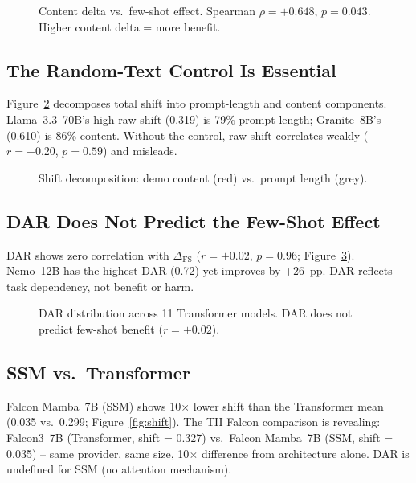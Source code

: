 \documentclass[11pt,a4paper]{article}
\begin{document}
\begin{figure}[t]
\centering

\caption{Content delta vs.\ few-shot effect. Spearman $\rho = +0.648$, $p = 0.043$. Higher content delta = more benefit.}
\label{fig:content_delta}
\end{figure}

\subsection{The Random-Text Control Is Essential}

Figure~\ref{fig:decomposition} decomposes total shift into prompt-length and content components. Llama~3.3~70B's high raw shift (0.319) is 79\% prompt length; Granite~8B's (0.610) is 86\% content. Without the control, raw shift correlates weakly ($r = +0.20$, $p = 0.59$) and misleads.

\begin{figure}[t]
\centering

\caption{Shift decomposition: demo content (red) vs.\ prompt length (grey).}
\label{fig:decomposition}
\end{figure}

\subsection{DAR Does Not Predict the Few-Shot Effect}

DAR shows zero correlation with $\Delta_{\text{FS}}$ ($r = +0.02$, $p = 0.96$; Figure~\ref{fig:dar}). Nemo~12B has the highest DAR (0.72) yet improves by +26~pp. DAR reflects task dependency, not benefit or harm.

\begin{figure}[t]
\centering

\caption{DAR distribution across 11 Transformer models. DAR does not predict few-shot benefit ($r = +0.02$).}
\label{fig:dar}
\end{figure}

\subsection{SSM vs.\ Transformer}

Falcon Mamba~7B (SSM) shows 10$\times$ lower shift than the Transformer mean (0.035 vs.\ 0.299; Figure~\ref{fig:shift}). The TII Falcon comparison is revealing: Falcon3~7B (Transformer, shift = 0.327) vs.\ Falcon Mamba~7B (SSM, shift = 0.035) -- same provider, same size, 10$\times$ difference from architecture alone. DAR is undefined for SSM (no attention mechanism).
\end{document}
